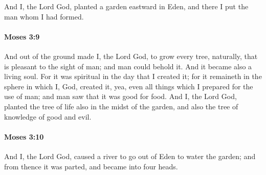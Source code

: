 			And I, the Lord God, planted a garden eastward in Eden, and there I put the man whom I had formed.


		\paragraph{Moses 3:9} %
			\label{MOSES-3-9}

			And out of the ground made I, the Lord God, to grow every tree, naturally, that is pleasant to the sight of man; and man could behold it. And it became also a living soul. For it was spiritual in the day that I created it; for it remaineth in the sphere in which I, God, created it, yea, even all things which I prepared for the use of man; and man saw that it was good for food. And I, the Lord God, planted the tree of life also in the midst of the garden, and also the tree of knowledge of good and evil.


		\paragraph{Moses 3:10} %
			\label{MOSES-3-10}

			And I, the Lord God, caused a river to go out of Eden to water the garden; and from thence it was parted, and became into four heads.


